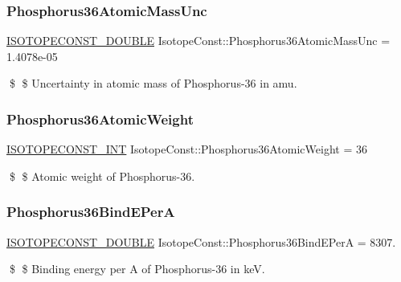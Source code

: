\subsubsection{\texorpdfstring{Phosphorus36\+Atomic\+Mass\+Unc}{Phosphorus36AtomicMassUnc}}
{\footnotesize\ttfamily \mbox{\hyperlink{group___isotope_const-_macros_ga8f45a7272ce02c0b4c65c44636ed719a}{I\+S\+O\+T\+O\+P\+E\+C\+O\+N\+S\+T\+\_\+\+D\+O\+U\+B\+LE}} Isotope\+Const\+::\+Phosphorus36\+Atomic\+Mass\+Unc = 1.\+4078e-\/05}

\$ \$ Uncertainty in atomic mass of Phosphorus-\/36 in amu. \mbox{\label{group___isotope_const-_phosphorus-_p36_ga29cfd1598c3edb2b3d89f3549ee23e60}} 
\subsubsection{\texorpdfstring{Phosphorus36\+Atomic\+Weight}{Phosphorus36AtomicWeight}}
{\footnotesize\ttfamily \mbox{\hyperlink{group___isotope_const-_macros_ga5f18360b3e99483a35c32d789e62621c}{I\+S\+O\+T\+O\+P\+E\+C\+O\+N\+S\+T\+\_\+\+I\+NT}} Isotope\+Const\+::\+Phosphorus36\+Atomic\+Weight = 36}

\$ \$ Atomic weight of Phosphorus-\/36. \mbox{\label{group___isotope_const-_phosphorus-_p36_gaffd9bf3e3e0a449929a134fe33f63f8e}} 
\subsubsection{\texorpdfstring{Phosphorus36\+Bind\+E\+PerA}{Phosphorus36BindEPerA}}
{\footnotesize\ttfamily \mbox{\hyperlink{group___isotope_const-_macros_ga8f45a7272ce02c0b4c65c44636ed719a}{I\+S\+O\+T\+O\+P\+E\+C\+O\+N\+S\+T\+\_\+\+D\+O\+U\+B\+LE}} Isotope\+Const\+::\+Phosphorus36\+Bind\+E\+PerA = 8307.}

\$ \$ Binding energy per A of Phosphorus-\/36 in keV. \mbox{\label{group___isotope_const-_phosphorus-_p36_ga96accaa599a86153a81386f5f1d5383e}} 
